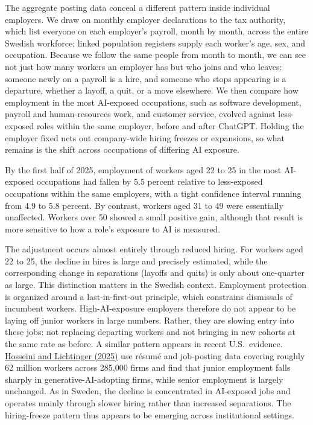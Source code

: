 \documentclass[12pt]{article}
\begin{document}
The aggregate posting data conceal a different pattern inside individual employers. We draw on monthly
employer declarations to the tax authority, which list everyone on each employer's payroll, month by
month, across the entire Swedish workforce; linked population registers supply each worker's age, sex,
and occupation. Because we follow the same people from month to month, we can see not just how many
workers an employer has but who joins and who leaves: someone newly on a payroll is a hire, and someone
who stops appearing is a departure, whether a layoff, a quit, or a move elsewhere. We then compare how employment in the
most AI-exposed occupations, such as software development, payroll and human-resources work, and
customer service, evolved against less-exposed roles within the same employer, before and after
ChatGPT. Holding the employer fixed nets out company-wide hiring freezes or expansions, so what remains
is the shift across occupations of differing AI exposure.

By the first half of 2025, employment of workers aged 22 to 25 in the most AI-exposed occupations had
fallen by 5.5 percent relative to less-exposed occupations within the same employers, with a tight
confidence interval running from 4.9 to 5.8 percent. By contrast, workers aged 31 to 49 were
essentially unaffected. Workers over 50 showed a small positive gain, although that result is more
sensitive to how a role's exposure to AI is measured.

The adjustment occurs almost entirely through reduced hiring. For workers aged 22 to 25, the decline
in hires is large and precisely estimated, while the corresponding change in separations (layoffs and
quits) is only about one-quarter as large. This distinction matters in the Swedish context.
Employment protection is organized around a last-in-first-out principle, which constrains dismissals
of incumbent workers. High-AI-exposure employers therefore do not appear to be laying off junior
workers in large numbers. Rather, they are slowing entry into these jobs: not replacing departing
workers and not bringing in new cohorts at the same rate as before. A similar pattern appears in
recent U.S.\ evidence.
\href{https://papers.ssrn.com/sol3/papers.cfm?abstract_id=5425555}{Hosseini and Lichtinger (2025)}
use résumé and job-posting data covering roughly 62 million workers across 285{,}000 firms and find
that junior employment falls sharply in generative-AI-adopting firms, while senior employment is
largely unchanged. As in Sweden, the decline is concentrated in AI-exposed jobs and operates mainly
through slower hiring rather than increased separations. The hiring-freeze pattern thus appears to be
emerging across institutional settings.
\end{document}

